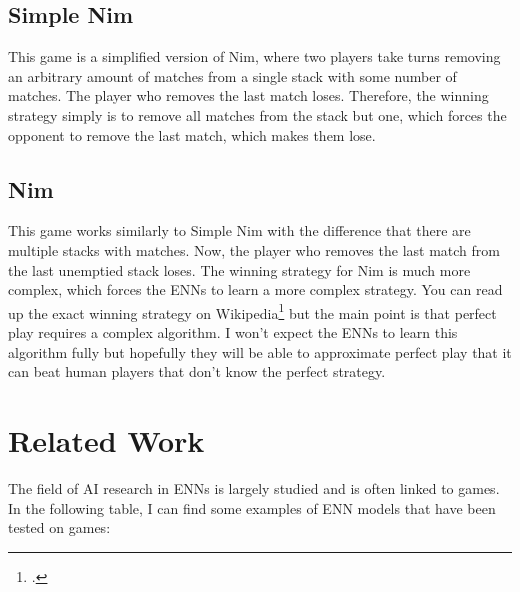 \documentclass[11pt]{report}
\begin{document}
\begin{enumerate}
    \subsection{Simple Nim}\label{subsec:simple-nim}
    This game is a simplified version of Nim, where two players take turns removing an arbitrary amount of matches from a single stack with some number of matches.
    The player who removes the last match loses.
    Therefore, the winning strategy simply is to remove all matches from the stack but one, which forces the opponent to remove the last match, which makes them lose.

    \subsection{Nim}\label{subsec:nim}
    This game works similarly to Simple Nim with the difference that there are multiple stacks with matches.
    Now, the player who removes the last match from the last unemptied stack loses.
    The winning strategy for Nim is much more complex, which forces the ENNs to learn a more complex strategy.
    You can read up the exact winning strategy on Wikipedia\footcite{nim_23} but the main point is that perfect play requires a complex algorithm.
    I won't expect the ENNs to learn this algorithm fully but hopefully they will be able to approximate perfect play that it can beat human players that don't know the perfect strategy.


    \section{Related Work}\label{sec:related-work}
    The field of AI research in ENNs is largely studied and is often linked to games.
    In the following table, I can find some examples of ENN models that have been tested on games:


\end{enumerate}
\end{document}
